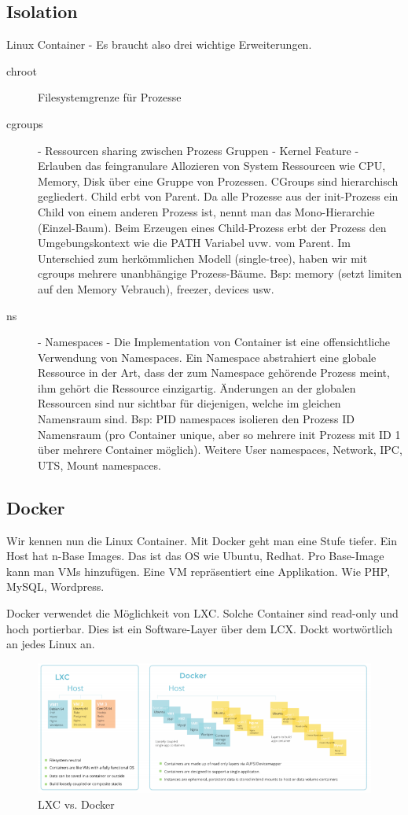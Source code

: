\subsection{Isolation}
Linux Container - Es braucht also drei wichtige Erweiterungen.
\begin{description}
	\item[chroot] Filesystemgrenze für Prozesse
	\item[cgroups] - Ressourcen sharing zwischen Prozess Gruppen - Kernel Feature - Erlauben das feingranulare Allozieren von System Ressourcen wie CPU, Memory, Disk über eine Gruppe von Prozessen. CGroups sind hierarchisch gegliedert. Child erbt von Parent. Da alle Prozesse aus der init-Prozess ein Child von einem anderen Prozess ist, nennt man das Mono-Hierarchie (Einzel-Baum).  Beim Erzeugen eines Child-Prozess erbt der Prozess den Umgebungskontext wie die PATH Variabel uvw. vom Parent. Im Unterschied zum herkömmlichen Modell (single-tree), haben wir mit cgroups mehrere unanbhängige Prozess-Bäume. Bsp: memory (setzt limiten auf den Memory Vebrauch), freezer, devices usw.
	\item[ns] - Namespaces - Die Implementation von Container ist eine offensichtliche Verwendung von Namespaces. Ein Namespace abstrahiert eine globale Ressource in der Art, dass der zum Namespace gehörende Prozess meint, ihm gehört die Ressource einzigartig. Änderungen an der globalen Ressourcen sind nur sichtbar für diejenigen, welche im gleichen Namensraum sind. Bsp: PID namespaces isolieren den Prozess ID Namensraum (pro Container unique, aber so mehrere init Prozess mit ID 1 über mehrere Container möglich). Weitere User namespaces, Network, IPC, UTS, Mount namespaces.
\end{description} 

\subsection{Docker}
Wir kennen nun die Linux Container. Mit Docker geht man eine Stufe tiefer. Ein Host hat n-Base Images. Das ist das OS wie Ubuntu, Redhat. Pro Base-Image kann man VMs hinzufügen. Eine VM repräsentiert eine Applikation. Wie PHP, MySQL, Wordpress.

Docker verwendet die Möglichkeit von LXC. Solche Container sind read-only und hoch portierbar. Dies ist ein Software-Layer über dem LCX. Dockt wortwörtlich an jedes Linux an.

\begin{figure}[h!]
\centering
\includegraphics[width=\linewidth]{fig/lxc-vs-docker}
\caption{LXC vs. Docker}
\label{fig:lxc-vs-docker}
\end{figure}